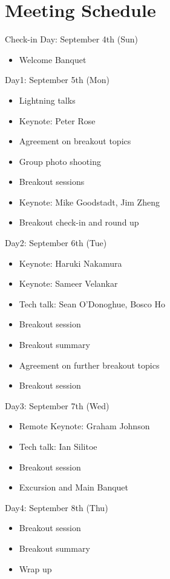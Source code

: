 \documentclass[a4paper]{article}
\begin{document}
\section{Meeting Schedule}
\begin{bfseries}
Check-in Day: September 4th (Sun)
\end{bfseries}
\begin{itemize}
\item Welcome Banquet
\end{itemize}
\begin{bfseries}
{Day1: September 5th (Mon)}
\end{bfseries}
\begin{itemize}
\item Lightning talks
\item Keynote: Peter Rose
\item Agreement on breakout topics
\item Group photo shooting
\item Breakout sessions
\item Keynote: Mike Goodstadt, Jim Zheng
\item Breakout check-in and round up
\end{itemize}
\begin{bfseries}
Day2: September 6th (Tue)
\end{bfseries}
\begin{itemize}
\item Keynote: Haruki Nakamura
\item Keynote: Sameer Velankar
\item Tech talk: Sean O'Donoghue, Bosco Ho
\item Breakout session
\item Breakout summary
\item Agreement on further breakout topics
\item Breakout session
\end{itemize}
\begin{bfseries}
Day3: September 7th (Wed)
\end{bfseries}
\begin{itemize}
\item Remote Keynote: Graham Johnson
\item Tech talk: Ian Silitoe
\item Breakout session
\item Excursion and Main Banquet
\end{itemize}
\begin{bfseries}
Day4: September 8th (Thu)
\end{bfseries}
\begin{itemize}
\item Breakout session
\item Breakout summary
\item Wrap up
\end{itemize}
\end{document}
